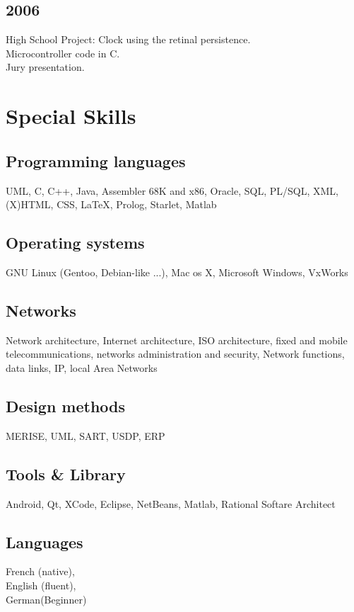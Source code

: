 	\subsection{2006}
		{High School Project: Clock using the retinal persistence.\\
		 Microcontroller code in C.\\
		 Jury presentation.}
		
\section{Special Skills}
	\subsection{Programming languages}
		{UML, C, C++, Java, Assembler 68K and x86, Oracle, SQL, PL/SQL, XML, (X)HTML, CSS, \LaTeX, Prolog, Starlet, Matlab}
		
	\subsection{Operating systems}
		{GNU Linux (Gentoo, Debian-like ...), Mac os X, Microsoft Windows, VxWorks}
		
	\subsection{Networks}
		{Network architecture, Internet architecture, ISO architecture, fixed and mobile telecommunications, networks administration and security, Network functions, data links, IP, local Area Networks}

	\subsection{Design methods}
		{MERISE, UML, SART, USDP, ERP}
		
	\subsection{Tools \& Library}
		{Android, Qt, XCode, Eclipse, NetBeans, Matlab, Rational Softare Architect}
		
	\subsection{Languages}
		{French (native),\\English (fluent),\\German(Beginner)}
				
